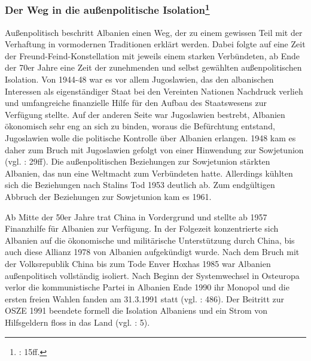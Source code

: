 \subsubsection[Der Weg in die außenpolitische Isolation]{Der Weg in die außenpolitische Isolation\footnote{\cite{vollmer07} : 15ff.}}

Außenpolitisch beschritt Albanien einen Weg, der zu einem gewissen Teil mit der Verhaftung in vormodernen Traditionen erklärt werden. Dabei folgte auf eine Zeit der Freund-Feind-Konstellation mit jeweils einem starken Verbündeten, ab Ende der 70er Jahre eine Zeit der zunehmenden und selbst gewählten außenpolitischen Isolation. Von 1944-48 war es vor allem Jugoslawien, das den albanischen Interessen als eigenständiger Staat bei den Vereinten Nationen Nachdruck verlieh und umfangreiche finanzielle Hilfe für den Aufbau des Staatswesens zur Verfügung stellte. Auf der anderen Seite war Jugoslawien bestrebt, Albanien ökonomisch sehr eng an sich zu binden, woraus die Befürchtung entstand, Jugoslawien wolle die politische Kontrolle über Albanien erlangen. 1948 kam es daher zum Bruch mit Jugoslawien gefolgt von einer Hinwendung zur Sowjetunion (vgl. \cite{odonnell} : 29ff). Die außenpolitischen Beziehungen zur Sowjetunion stärkten Albanien, das nun eine Weltmacht zum Verbündeten hatte. Allerdings kühlten sich die Beziehungen nach Stalins Tod 1953 deutlich ab. Zum endgültigen Abbruch der Beziehungen zur Sowjetunion kam es 1961.\par
Ab Mitte der 50er Jahre trat China in Vordergrund und stellte ab 1957 Finanzhilfe für Albanien zur Verfügung. In der Folgezeit konzentrierte sich Albanien auf die ökonomische und militärische Unterstützung durch China, bis auch diese Allianz 1978 von Albanien aufgekündigt wurde. Nach dem Bruch mit der Volksrepublik China bis zum Tode Enver Hoxhas 1985 war Albanien außenpolitisch vollständig isoliert. Nach Beginn der Systemwechsel in Osteuropa verlor die kommunistische Partei in Albanien Ende 1990 ihr Monopol und die ersten freien Wahlen fanden am 31.3.1991 statt (vgl. \cite{ammann} : 486). Der Beitritt zur OSZE 1991 beendete formell die Isolation Albaniens und ein Strom von Hilfsgeldern floss in das Land (vgl. \cite{deza} : 5).\par
